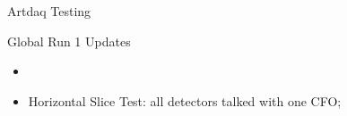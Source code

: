 \documentclass{beamer}[10pt]
\begin{document}
\begin{frame}{Artdaq Testing}
\end{frame}
\begin{frame}{Global Run 1 Updates}
\begin{itemize}
\item 
\item Horizontal Slice Test: all detectors talked with one CFO;
\end{itemize}
\end{frame} 
\iffalse



global run details: prima instabile 
abbiamo ancora il firmware vecchio su daq09
non ancora testato ilsoftware nuobo e accennare il rate ma non e un problema perche possiamo continuare a caratterizzare abbastanza bene l apparato (artdaq non e stato testato a quei rate) e pure slow control
daq is composed of controlling, monitoring and data flowing
gains, voltages devono essere controllati
slide con immagine del tracker board : hardware building that dtc-dtc connection
event building avverra nel dtc , not for cosmics
to be done: implementare lo slow control dei lowhigh voltage

qt
\fi
\end{document}
